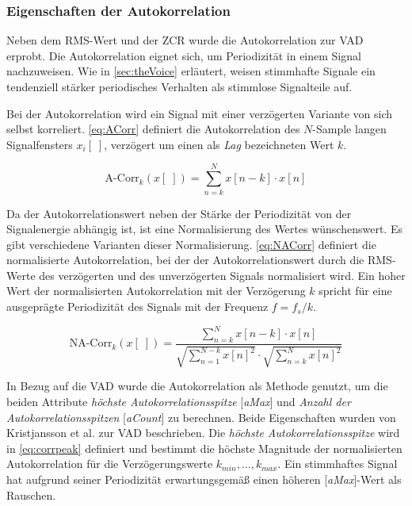 \subsubsection{Eigenschaften der Autokorrelation}

Neben dem RMS-Wert und der ZCR wurde die Autokorrelation zur VAD erprobt. Die Autokorrelation eignet sich, um Periodizität in einem Signal nachzuweisen. Wie in \autoref{sec:theVoice} erläutert, weisen stimmhafte Signale ein tendenziell stärker periodisches Verhalten als stimmlose Signalteile auf. 

Bei der Autokorrelation wird ein Signal mit einer verzögerten Variante von sich selbst korreliert. \autoref{eq:ACorr} definiert die Autokorrelation des $N$-Sample langen Signalfensters $x_i[\;]$, verzögert um einen als \emph{Lag} bezeichneten Wert $k$.

\begin{equation}
\text{A-Corr}_k(x[\;]) = \sum_{n=k}^{N} x[n-k] \cdot x[n]
\label{eq:ACorr}
\end{equation}

Da der Autokorrelationswert neben der Stärke der Periodizität von der Signalenergie abhängig ist, ist eine Normalisierung des Wertes wünschenswert. Es gibt verschiedene Varianten dieser Normalisierung. \autoref{eq:NACorr} definiert die \glqq normalisierte Autokorrelation\grqq{}, bei der der Autokorrelationswert durch die RMS-Werte des verzögerten und des unverzögerten Signals normalisiert wird. Ein hoher Wert der normalisierten Autokorrelation mit der Verzögerung $k$ spricht für eine ausgeprägte Periodizität des Signals mit der Frequenz $f =  f_s / k $.\cite{vad_Lisboa}

\begin{equation}
\text{NA-Corr}_k(x[\;]) = \frac{\sum_{n=k}^{N} x[n-k] \cdot x[n]}{ \sqrt{\sum_{n=1}^{N-k}  x[n]^2}  \cdot  \sqrt{\sum_{n=k}^{N}  x[n]^2} }
\label{eq:NACorr}
\end{equation}



In Bezug auf die VAD wurde die Autokorrelation als Methode genutzt, um die beiden Attribute \emph{höchste Autokorrelationsspitze} [\emph{aMax}] und \emph{Anzahl der Autokorrelationsspitzen} [\emph{aCount}] zu berechnen. Beide Eigenschaften wurden von Kristjansson et al. \cite[S. 1 - 2]{vad_Lisboa} zur VAD beschrieben. Die \emph{höchste Autokorrelationsspitze} wird in \autoref{eq:corrpeak} definiert und bestimmt die höchste Magnitude der normalisierten Autokorrelation für die Verzögerungswerte $k_{min} , \ldots , k_{max}$. Ein stimmhaftes Signal hat aufgrund seiner Periodizität erwartungsgemäß einen höheren [\emph{aMax}]-Wert als Rauschen.

